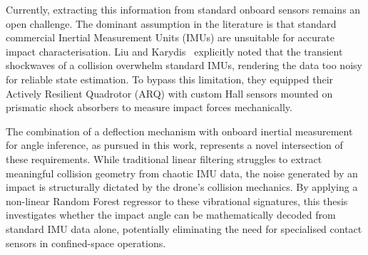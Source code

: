 Currently, extracting this information from standard onboard sensors remains an open challenge. The dominant assumption in the literature is that standard commercial Inertial Measurement Units (IMUs) are unsuitable for accurate impact characterisation. Liu and Karydis~\cite{liuImpactresilientQuadrotorDesign2021} explicitly noted that the transient shockwaves of a collision overwhelm standard IMUs, rendering the data too noisy for reliable state estimation. To bypass this limitation, they equipped their Actively Resilient Quadrotor (ARQ) with custom Hall sensors mounted on prismatic shock absorbers to measure impact forces mechanically.

The combination of a deflection mechanism with onboard inertial measurement for angle inference, as pursued in this work, represents a novel intersection of these requirements. While traditional linear filtering struggles to extract meaningful collision geometry from chaotic IMU data, the noise generated by an impact is structurally dictated by the drone's collision mechanics. By applying a non-linear Random Forest regressor to these vibrational signatures, this thesis investigates whether the impact angle can be mathematically decoded from standard IMU data alone, potentially eliminating the need for specialised contact sensors in confined-space operations.
